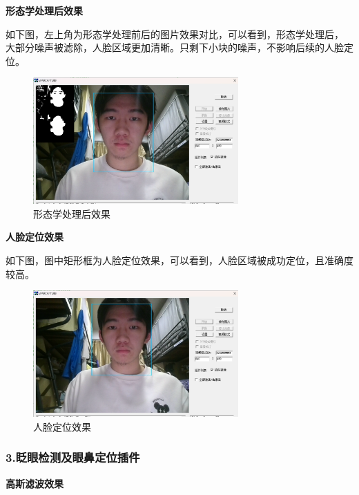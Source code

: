 \documentclass[12pt,hyperref,a4paper,UTF8]{ctexart}
\begin{document}
        \large \textbf{形态学处理后效果}

        如下图，左上角为形态学处理前后的图片效果对比，可以看到，形态学处理后，
        大部分噪声被滤除，人脸区域更加清晰。只剩下小块的噪声，不影响后续的人脸定位。
        \begin{figure}[H]
            \centering
            \includegraphics[width=0.7\textwidth]{./figures/fig/image16.png}
            \caption{形态学处理后效果}
            \label{fig:example}
        \end{figure}

        \large \textbf{人脸定位效果}

        如下图，图中矩形框为人脸定位效果，可以看到，人脸区域被成功定位，且准确度较高。
        \begin{figure}[H]
            \centering
            \includegraphics[width=0.7\textwidth]{./figures/fig/image17.png}
            \caption{人脸定位效果}
            \label{fig:example}
        \end{figure}





        \subsubsection*{\large \textbf{3.眨眼检测及眼鼻定位插件}}

        \large \textbf{高斯滤波效果}
\end{document}
